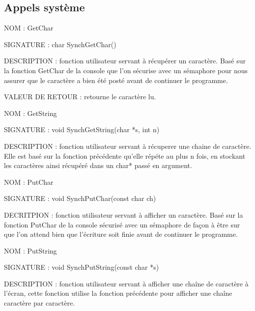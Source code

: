 \documentclass{article}
\begin{document}
	\subsection{Appels système}
	\begin{description}
		\item{NOM :} GetChar
		\item{SIGNATURE : } char SynchGetChar()
		\item{DESCRIPTION :} fonction utilisateur servant à récupérer un caractère. Basé sur la fonction GetChar de la console que l'on sécurise avec un sémaphore pour nous assurer que le caractère a bien été posté avant de continuer le programme.\newline
		\item{VALEUR DE RETOUR : } retourne le caractère lu.
	\end{description}
	\begin{description}
		\item{NOM : } GetString
		\item{SIGNATURE : } void SynchGetString(char *s, int n)
		\item{DESCRIPTION : } fonction utilisateur servant à récuperer une chaine de caractère. Elle est basé sur la fonction précédente qu'elle répéte au plus n fois, en stockant les caractères ainsi récupéré dans un char* passé en argument.
	\end{description}
	\begin{description}
		\item{NOM : } PutChar
		\item{SIGNATURE : } void SynchPutChar(const char ch)
		\item{DECRITPION : } fonction utilisateur servant à afficher un caractère. Basé sur la fonction PutChar de la console sécurisé avec un sémaphore de façon à être sur que l'on attend bien que l'écriture soit finie avant de continuer le programme.
	\end{description}
	\begin{description}
		\item{NOM : } PutString
		\item{SIGNATURE : } void SynchPutString(const char *s)
		\item{DESCRIPTION : } fonction utilisateur servant à afficher une chaîne de caractère à l'écran, cette fonction utilise la fonction précédente pour afficher une chaîne caractère par caractère.
	\end{description}
\end{document}
